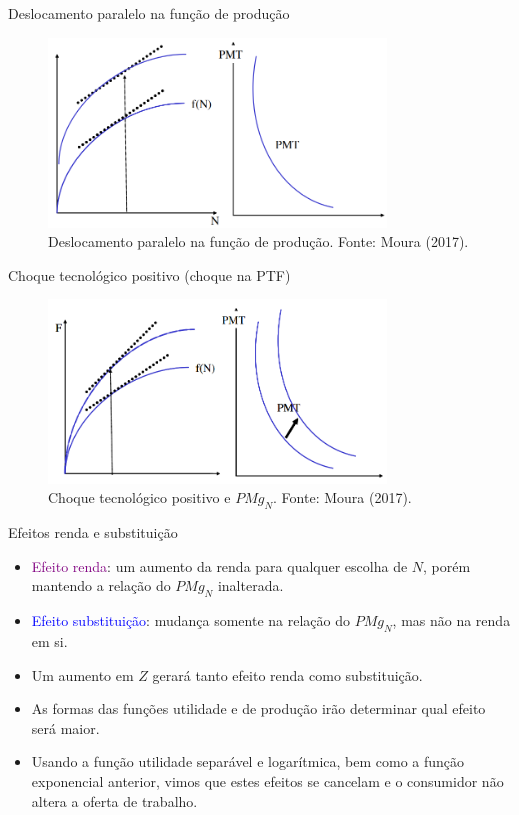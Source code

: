 \documentclass[10pt]{beamer}
\begin{document}
\begin{frame}{Deslocamento paralelo na função de produção}
    \begin{figure}
        \centering
        \includegraphics[width=0.8\textwidth]{./figures/aula14_fig11.PNG}
        \caption{Deslocamento paralelo na função de produção. Fonte: Moura (2017).}
        \label{fig11}
    \end{figure}
\end{frame}

\begin{frame}{Choque tecnológico positivo (choque na PTF)}
    \begin{figure}
        \centering
        \includegraphics[width=0.8\textwidth]{./figures/aula14_fig12.PNG}
        \caption{Choque tecnológico positivo e $PMg_N$. Fonte: Moura (2017).}
        \label{fig12}
    \end{figure}
\end{frame}

\begin{frame}{Efeitos renda e substituição}
    \begin{itemize}
        \item \textcolor{purple}{Efeito renda}: um aumento da renda para qualquer escolha de $N$, porém mantendo a relação do $PMg_N$ inalterada.
        \bigskip
        \item \textcolor{blue}{Efeito substituição}: mudança somente na relação do $PMg_N$, mas não na renda em si.
        \bigskip
        \item Um aumento em $Z$ gerará tanto efeito renda como substituição.
        \bigskip
        \item As formas das funções utilidade e de produção irão determinar qual efeito será maior.
        \bigskip
        \item Usando a função utilidade separável e logarítmica, bem como a função exponencial anterior, vimos que estes efeitos se cancelam e o consumidor não altera a oferta de trabalho.
    \end{itemize}
\end{frame}
\end{document}
